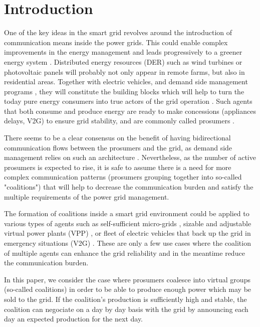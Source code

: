 \documentclass[conference]{IEEEtran}
\begin{document}
\section{Introduction}
\label{sec:introduction}

One of the key ideas in the smart grid revolves around the introduction of communication means inside the power grids. This could enable complex improvements in the energy management and leads progressively to a greener energy system \cite{Ramchurn} \cite{WuHamedHuangBook2011}. Distributed energy resources (DER) such as wind turbines or photovoltaic panels will probably not only appear in remote farms, but also in residential areas. Together with electric vehicles, and demand side management programs \cite{Samadi2014}, they will constitute the building blocks which will help to turn the today pure energy consumers into true actors of the grid operation \cite{Ramchurn}. Such agents that both consume and produce energy are ready to make concessions (appliances delays, V2G) to ensure grid stability, and are commonly called prosumers \cite{6883384,Ramchurn}.

There seems to be a clear consensus on the benefit of having bidirectional communication flows between the prosumers and the grid, as demand side management relies on such an architecture \cite{WuHamedHuangBook2011}. Nevertheless, as the number of active prosumers is expected to rise, it is safe to assume there is a need for more complex communication patterns (prosumers grouping together into so-called "coalitions") that will help to decrease the communication burden and satisfy the multiple requirements of the power grid management. 

The formation of coalitions inside a smart grid environment could be applied to various types of agents such as self-sufficient micro-grids \cite{Pahwa}, sizable and adjustable virtual power plants (VPP) \cite{Braun, Ramchurn}, or fleet of electric vehicles that back up the grid in emergency situations (V2G) \cite{Ramchurn}. These are only a few use cases where the coalition of multiple agents can enhance the grid reliability and in the meantime reduce the communication burden.

In this paper, we consider the case where prosumers coalesce into virtual groups (so-called coalitions) in order to be able to produce enough power which may be sold to the grid. If the coalition's production is sufficiently high and stable, the coalition can negociate on a day by day basis with the grid by announcing each day an expected production for the next day. 
\end{document}
